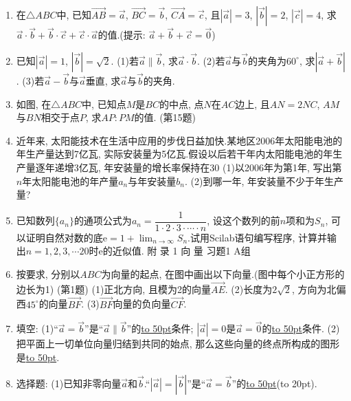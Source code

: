 \documentclass[10pt,a4paper]{article}
\newcommand{\blank}[1]{\underline{\hbox to #1pt{}}}
\newcommand{\bracket}[1]{(\hbox to #1pt{})}
\begin{document}
\begin{enumerate}[1.]
\item 在$\triangle ABC$中, 已知$\overrightarrow {AB}=\overrightarrow a$, $\overrightarrow {BC}=\overrightarrow b$, $\overrightarrow {CA}=\overrightarrow c$, 且$|\overrightarrow a|=3$, $|\overrightarrow b|=2$, $|\overrightarrow c|=4$, 求$\overrightarrow a\cdot \overrightarrow b+\overrightarrow b\cdot \overrightarrow c+\overrightarrow c\cdot \overrightarrow a$的值.(提示: $\overrightarrow a+\overrightarrow b+\overrightarrow c=\overrightarrow 0$)
\item 已知$|\overrightarrow a|=1$, $|\overrightarrow b|=\sqrt 2$.
(1)若$\overrightarrow a\parallel \overrightarrow b$, 求$\overrightarrow a\cdot \overrightarrow b$.
(2)若$\overrightarrow a$与$\overrightarrow b$的夹角为$60^{\circ }$, 求$|\overrightarrow a+\overrightarrow b|$.
(3)若$\overrightarrow a-\overrightarrow b$与$\overrightarrow a$垂直, 求$\overrightarrow a$与$\overrightarrow b$的夹角.
\item 如图, 在$\triangle ABC$中, 已知点$M$是$BC$的中点, 点$N$在$AC$边上, 且$AN=2NC$, $AM$与$BN$相交于点$P$, 求$AP:PM$的值.
(第15题)
\item 近年来, 太阳能技术在生活中应用的步伐日益加快.某地区2006年太阳能电池的年生产量达到7亿瓦, 实际安装量为5亿瓦.假设以后若干年内太阳能电池的年生产量逐年递增3亿瓦, 年安装量的增长率保持在30%
(1)以2006年为第1年, 写出第$n$年太阳能电池的年产量$a_n$与年安装量$b_n$.
(2)到哪一年, 年安装量不少于年生产量?
\item 已知数列$\{a_n\}$的通项公式为$a_n=\dfrac 1{1\cdot 2\cdot 3\cdot \cdots \cdot n}$, 设这个数列的前$n$项和为$S_n$, 可以证明自然对数的底$\mathrm{e}=1+\displaystyle\lim_{n\to\infty}S_n$.试用Scilab语句编写程序, 计算并输出$n=1,2,3,\cdots 20$时$\mathrm{e}$的近似值.
附  录
1  向  量
习题1  A组
\item 按要求, 分别以$ABC$为向量的起点, 在图中画出以下向量.(图中每个小正方形的边长为1)
(第1题)
(1)正北方向, 且模为2的向量$\overrightarrow {AE}$.
(2)长度为$2\sqrt 2$, 方向为北偏西$45^{\circ }$的向量$\overrightarrow {BF}$.
(3)$\overrightarrow {BF}$向量的负向量$\overrightarrow {CF}$.
\item 填空:
(1)``$\overrightarrow a=\overrightarrow b$''是``$\overrightarrow a\parallel \overrightarrow b$''的\blank{50}条件; $|\overrightarrow a|=0$是$\overrightarrow a=\overrightarrow 0$的\blank{50}条件.
(2)把平面上一切单位向量归结到共同的始点, 那么这些向量的终点所构成的图形是\blank{50}.
\item 选择题:
(1)已知非零向量$\overrightarrow a$和$\overrightarrow b$.``$|\overrightarrow a|=|\overrightarrow b|$''是``$\overrightarrow a=\overrightarrow b$''的\blank{50}\bracket{20}.

\end{enumerate}
\end{document}
